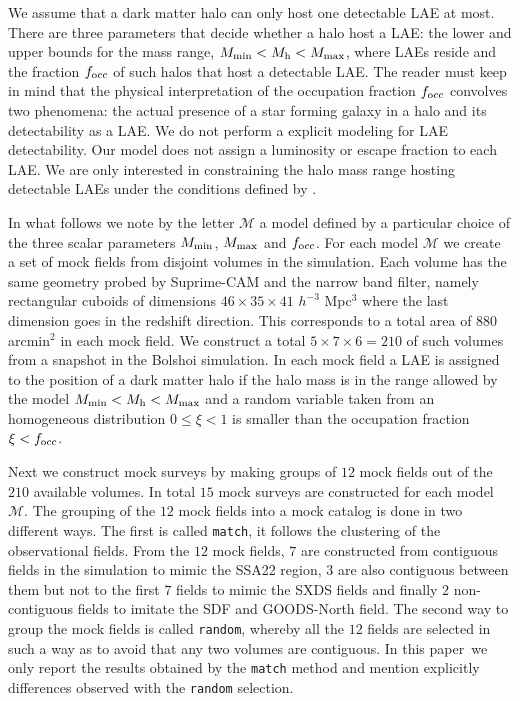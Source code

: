 \documentclass[usenatbib]{mn2e}
\newcommand{\documentname}{paper~}
\begin{document}
We assume that a dark matter halo can only host one
detectable LAE at most.  There are three parameters that
decide whether a halo host a LAE: the lower and upper bounds for the
mass range, $M_{\rm min}< M_{\rm h} < M_{\rm max}$, where LAEs reside and the fraction $f_{\rm occ}$ of such halos that host a detectable LAE. The reader
must keep in mind that the physical interpretation of the occupation
fraction $f_{\rm occ}$ convolves two phenomena: the actual presence of a star
forming galaxy in a halo and its detectability as a LAE.  We do not
perform a explicit modeling for LAE detectability. Our model does not
assign a luminosity or escape fraction to each LAE.  We are only
interested in constraining the halo mass range hosting detectable LAEs
under the conditions defined by \cite{Yamada2012}.  


In what follows we note by the letter ${\mathcal M}$ a model
defined by a particular choice of the three scalar parameters $M_{\rm
  min}$, $M_{\rm  max}$ and $f_{\rm occ}$. For each model ${\mathcal
  M}$ we create a set of mock fields from disjoint volumes in the
simulation. Each volume has the same geometry probed by Suprime-CAM
and the narrow band filter, namely rectangular cuboids of dimensions
$46\times 35\times 41$ $h^{-3}$ Mpc$^{3}$ where the last dimension goes
in the redshift direction. This corresponds to a total area of $880$
arcmin$^{2}$ in each mock field. We construct a total $5\times 7
\times 6=210$ of such volumes from a snapshot in the Bolshoi
simulation. In each mock field a LAE is assigned to the position of a
dark matter halo if the halo mass is in the range allowed by the model
$M_{\rm min}<M_{\rm h}<M_{\rm max}$ and a random variable taken from
an homogeneous distribution $0\leq \xi<1$ is smaller than the occupation
fraction $\xi<f_{\rm occ}$.

Next we construct mock surveys by making groups of $12$ mock fields
out of the $210$ available volumes. In total $15$ mock surveys are
constructed for each model $\mathcal{M}$. The grouping of the $12$
mock fields into a mock catalog is done in two different ways. The
first is called {\texttt{match}}, it follows the clustering of the
observational fields. From the $12$ mock fields, $7$ are constructed
from contiguous fields in the simulation to mimic the SSA22 region,
$3$ are also contiguous between them but not to the first $7$ fields
to mimic the SXDS fields and finally $2$ non-contiguous fields to
imitate the SDF and GOODS-North field.   The second way to group the
mock fields is called {\texttt{random}}, whereby all the $12$ fields
are selected in such a way as to avoid that any two volumes are
contiguous. In this \documentname we only report the results obtained
by the {\texttt{match}} method and mention explicitly differences
observed with the {\texttt{random}} selection. 
\end{document}
